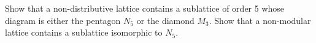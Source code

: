 Show that a non-distributive lattice contains a sublattice of order 5 whose diagram is either the pentagon $N_5$ or the diamond $M_3$. Show that a non-modular lattice contains a sublattice isomorphic to $N_5$.
